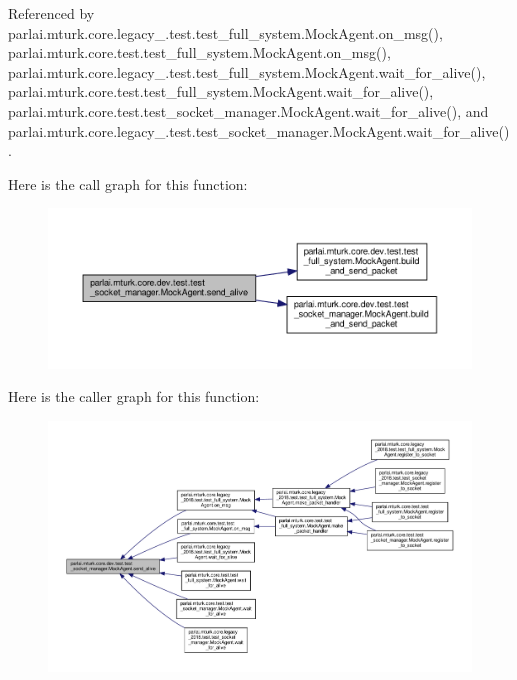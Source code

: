 Referenced by parlai.\+mturk.\+core.\+legacy\+\_.\+test.\+test\+\_\+full\+\_\+system.\+Mock\+Agent.\+on\+\_\+msg(), parlai.\+mturk.\+core.\+test.\+test\+\_\+full\+\_\+system.\+Mock\+Agent.\+on\+\_\+msg(), parlai.\+mturk.\+core.\+legacy\+\_.\+test.\+test\+\_\+full\+\_\+system.\+Mock\+Agent.\+wait\+\_\+for\+\_\+alive(), parlai.\+mturk.\+core.\+test.\+test\+\_\+full\+\_\+system.\+Mock\+Agent.\+wait\+\_\+for\+\_\+alive(), parlai.\+mturk.\+core.\+test.\+test\+\_\+socket\+\_\+manager.\+Mock\+Agent.\+wait\+\_\+for\+\_\+alive(), and parlai.\+mturk.\+core.\+legacy\+\_.\+test.\+test\+\_\+socket\+\_\+manager.\+Mock\+Agent.\+wait\+\_\+for\+\_\+alive().

Here is the call graph for this function\+:
\nopagebreak
\begin{figure}[H]
\begin{center}
\leavevmode
\includegraphics[width=350pt]{classparlai_1_1mturk_1_1core_1_1dev_1_1test_1_1test__socket__manager_1_1MockAgent_aa6b3ec5ae40ee38cb6114ee0f6bba21e_cgraph}
\end{center}
\end{figure}
Here is the caller graph for this function\+:
\nopagebreak
\begin{figure}[H]
\begin{center}
\leavevmode
\includegraphics[width=350pt]{classparlai_1_1mturk_1_1core_1_1dev_1_1test_1_1test__socket__manager_1_1MockAgent_aa6b3ec5ae40ee38cb6114ee0f6bba21e_icgraph}
\end{center}
\end{figure}
